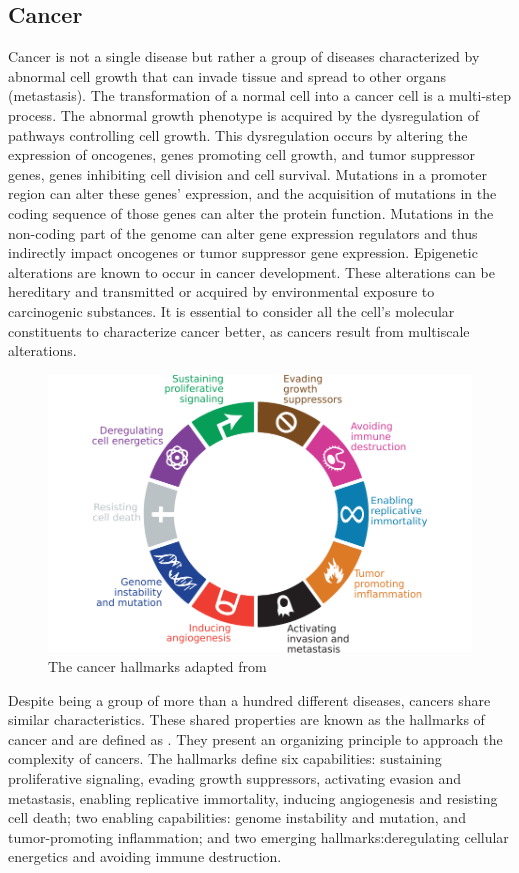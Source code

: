 \documentclass[../main.tex]{subfiles}
\begin{document}
	\subsection{Cancer}
		Cancer is not a single disease but rather a group of diseases characterized by abnormal cell growth that can invade tissue and spread to other organs (metastasis).
		The transformation of a normal cell into a cancer cell is a multi-step process.
		The abnormal growth phenotype is acquired by the dysregulation of pathways controlling cell growth.
		This dysregulation occurs by altering the expression of oncogenes, genes promoting cell growth, and tumor suppressor genes, genes inhibiting cell division and cell survival.
		Mutations in a promoter region can alter these genes' expression, and the acquisition of mutations in the coding sequence of those genes can alter the protein function.
		Mutations in the non-coding part of the genome can alter gene expression regulators and thus indirectly impact oncogenes or tumor suppressor gene expression.
		Epigenetic alterations are known to occur in cancer development.
		These alterations can be hereditary and transmitted or acquired by environmental exposure to carcinogenic substances.
		It is essential to consider all the cell's molecular constituents to characterize cancer better, as cancers result from multiscale alterations.

		\begin{figure}[htbp]
			\centering
			\includegraphics{CancerHallmarks.pdf}
			\caption[Cancer hallmarks]{The cancer hallmarks adapted from~\cite{Hanahan2011}}\label{fig:cancer_hallmarks}
		\end{figure}
		Despite being a group of more than a hundred different diseases, cancers share similar characteristics.
		These shared properties are known as the hallmarks of cancer and are defined as .
		They present an organizing principle to approach the complexity of cancers.
		The hallmarks define six capabilities: sustaining proliferative signaling, evading growth suppressors, activating evasion and metastasis, enabling replicative immortality, inducing angiogenesis and resisting cell death; two enabling capabilities: genome instability and mutation, and tumor-promoting inflammation; and two emerging hallmarks:deregulating cellular energetics and avoiding immune destruction.
\end{document}
